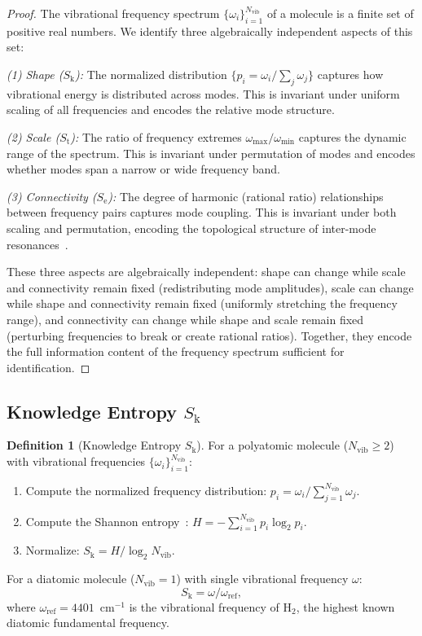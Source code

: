 \documentclass[11pt,twocolumn,a4paper]{article}
\theoremstyle{definition}
\newtheorem{definition}[theorem]{Definition}
\theoremstyle{remark}
\newcommand{\Sk}{S_{\mathrm{k}}}
\newcommand{\St}{S_{\mathrm{t}}}
\newcommand{\Se}{S_{\mathrm{e}}}
\newcommand{\Nvib}{N_{\mathrm{vib}}}
\begin{document}
\begin{proof}
The vibrational frequency spectrum $\{\omega_i\}_{i=1}^{\Nvib}$ of a molecule is a finite set of positive real numbers. We identify three algebraically independent aspects of this set:

\emph{(1) Shape ($\Sk$):} The normalized distribution $\{p_i = \omega_i / \sum_j \omega_j\}$ captures how vibrational energy is distributed across modes. This is invariant under uniform scaling of all frequencies and encodes the relative mode structure.

\emph{(2) Scale ($\St$):} The ratio of frequency extremes $\omega_{\max}/\omega_{\min}$ captures the dynamic range of the spectrum. This is invariant under permutation of modes and encodes whether modes span a narrow or wide frequency band.

\emph{(3) Connectivity ($\Se$):} The degree of harmonic (rational ratio) relationships between frequency pairs captures mode coupling. This is invariant under both scaling and permutation, encoding the topological structure of inter-mode resonances~\citep{fermi1931}.

These three aspects are algebraically independent: shape can change while scale and connectivity remain fixed (redistributing mode amplitudes), scale can change while shape and connectivity remain fixed (uniformly stretching the frequency range), and connectivity can change while shape and scale remain fixed (perturbing frequencies to break or create rational ratios). Together, they encode the full information content of the frequency spectrum sufficient for identification.
\end{proof}

\subsection{Knowledge Entropy $\Sk$}
\label{sec:sk}

\begin{definition}[Knowledge Entropy $\Sk$]
\label{def:sk}
For a polyatomic molecule ($\Nvib \geq 2$) with vibrational frequencies $\{\omega_i\}_{i=1}^{\Nvib}$:
\begin{enumerate}[label=(\alph*)]
  \item Compute the normalized frequency distribution: $p_i = \omega_i / \sum_{j=1}^{\Nvib} \omega_j$.
  \item Compute the Shannon entropy~\citep{shannon1948}: $H = -\sum_{i=1}^{\Nvib} p_i \log_2 p_i$.
  \item Normalize: $\Sk = H / \log_2 \Nvib$.
\end{enumerate}
For a diatomic molecule ($\Nvib = 1$) with single vibrational frequency $\omega$:
\[
  \Sk = \omega / \omega_{\mathrm{ref}},
\]
where $\omega_{\mathrm{ref}} = 4401$~cm$^{-1}$ is the vibrational frequency of H$_2$, the highest known diatomic fundamental frequency.
\end{definition}
\end{document}
